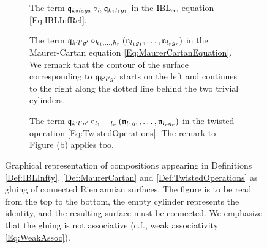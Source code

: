 \documentclass[\MainFolder/Text.tex]{subfiles}
\begin{document}
\begin{figure}[t]
\centering
\begin{subfigure}{\textwidth}
\centering

\caption{The term $\mathfrak{q}_{k_2 l_2 g_2} \circ_h \mathfrak{q}_{k_1 l_1 g_1}$ in the $\IBLInfty$-equation \eqref{Eq:IBLInfRel}.}
\end{subfigure}
\par\bigskip
\begin{subfigure}{\textwidth}
\centering

\caption{The term $\mathfrak{q}_{k' l' g'}\circ_{h_1,\dotsc,h_r} (\mathfrak{n}_{l_1 g_1},\dotsc,\mathfrak{n}_{l_r g_r})$ in the Maurer-Cartan equation \eqref{Eq:MaurerCartanEquation}. We remark that the contour of the surface corresponding to $\mathfrak{q}_{k'l'g'}$ starts on the left and continues to the right along the dotted line behind the two trivial cylinders.}
\end{subfigure}
\par\bigskip
\begin{subfigure}{\textwidth}
\centering

\caption{The term $\mathfrak{q}_{k' l' g'}\circ_{l_1,\dotsc, l_r} (\mathfrak{n}_{l_1 g_1},\dotsc,\mathfrak{n}_{l_r g_r})$ in the twisted operation \eqref{Eq:TwistedOperations}. The remark to Figure (b) applies too.}
\end{subfigure}
\caption[$\IBLInfty$-relations, Maurer-Cartan equation and twisting graphically.]{Graphical representation of compositions appearing in Definitions \ref{Def:IBLInfty}, \ref{Def:MaurerCartan} and \ref{Def:TwistedOperations} as gluing of connected Riemannian surfaces. The figure is to be read from the top  to the bottom, the empty cylinder represents the identity, and the resulting surface must be connected. We emphasize that the gluing is not associative (c.f., weak associativity \eqref{Eq:WeakAssoc}).}
\label{Fig:Surfaces}
\end{figure}
%
%
\end{document}
